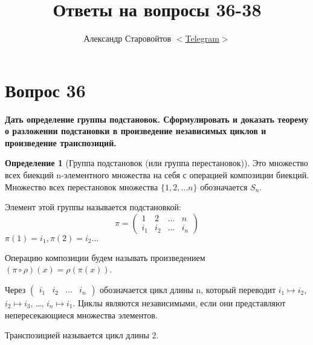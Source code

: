\documentclass{article}
\author{Александр Старовойтов %
$<$\href{https://t.me/stewkk}%
{Telegram}$>$}
\title{Ответы на вопросы 36-38}
\theoremstyle{definition}
\newtheorem{definition}{Определение}
\theoremstyle{plain}
\begin{document}
\maketitle
\section{Вопрос 36}
\textbf{Дать определение группы подстановок.
Сформулировать и доказать теорему о разложении подстановки в произведение независимых циклов и произведение транспозиций.}

\begin{definition}[Группа подстановок (или группа перестановок)]
  Это множество всех биекций n-элементного множества на себя с операцией композиции биекций.
  Множество всех перестановок множества $\{1, 2, \ldots{} n\}$ обозначается $S_{n}$.
\end{definition}
Элемент этой группы называется подстановкой:
\begin{equation*}
  \pi =
  \begin{pmatrix}
    1 & 2 & \ldots & n\\
    i_{1} & i_{2} & \ldots & i_{n}
  \end{pmatrix}
\end{equation*}
$\pi(1) = i_{1}, \pi(2) = i_{2} \ldots$

Операцию композиции будем называть произведением $(\pi\circ\rho)(x) = \rho(\pi(x))$.

Через $\begin{pmatrix}i_{1}&i_{2}&\ldots&i_{n}\end{pmatrix}$ обозначается цикл длины n, который переводит $i_{1} \mapsto i_{2}$, $i_{2} \mapsto i_{3}$, \ldots, $i_{n} \mapsto i_{1}$.
Циклы являются независимыми, если они представляют непересекающиеся множества элементов.

Транспозицией называется цикл длины 2.
\end{document}
